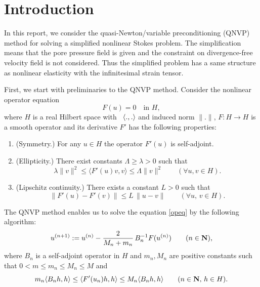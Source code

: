 \documentclass[12pt]{article}
\numberwithin{equation}{section}
\begin{document}
	
\section{Introduction}

In this report, we consider the quasi-Newton/variable preconditioning 
(QNVP) method for solving a simplified nonlinear Stokes problem. The simplification means that the pore pressure field is given \alert{and the constraint on divergence-free velocity field is not considered. Thus} the simplified problem has a same structure as nonlinear elasticity with the infinitesimal strain tensor.
	
First, we start with preliminaries to the QNVP method. Consider the nonlinear operator equation
\begin{equation}
	\label{opeq}
	F(u)= 0 \quad\mbox{in } H,
\end{equation}
where $H$ is a real Hilbert space with \ip \ $\langle .,. \rangle$ and induced norm $\|.\|$, $F:H\rightarrow H$ is a smooth operator and its derivative $F'$ has the following properties:
\begin{enumerate}
		\item[(i)] (Symmetry.) For any $u\in H$ the operator $F'(u)$ is self-adjoint.		
		\item[(ii)] (Ellipticity.) There exist constants $\Lambda\ge \lambda>0$  such that  
		\begin{equation}
		\label{f2}	
		\lambda \|v\|^2\leq\langle F'(u)v,v\rangle \leq \Lambda \|v\|^2\qquad (\forall u, v\in H).
		\end{equation}		
		\item[(iii)] (Lipschitz continuity.)	There exists a  constant  $L>0$ such that  
		$$
		\|F'(u)-F'(v)\|\leq L \, \|u-v\|  \qquad (\forall u,\, v\in H).
		$$
\end{enumerate}

The QNVP method enables us to solve the equation \eqref{opeq} by the following algorithm:
\begin{equation}
	\label{qniter}
	u^{(n+1)}:= u^{(n)} -\frac{2}{M_n+m_n} \, B_n^{-1} F(u^{(n)})\qquad (n\in{\bf N}), 
\end{equation}
where $B_n$ is a self-adjoint operator in $H$ and $m_n, M_n$ are positive constants such that $0<m\leq m_n\le M_n\leq M$ and
\begin{equation}
		\label{qnitsp}
		m_n \langle B_n h,h \rangle \le \langle F'(u_n)h,h \rangle \le M_n  \langle B_n h,h \rangle 
		\qquad  (n\in{\bf N}, \, h\in H).
\end{equation}
	
\end{document}
